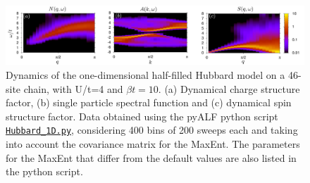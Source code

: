 \begin{figure}
\center
\includegraphics[width=\textwidth,clip]{Spectral_1D.pdf}

\caption{Dynamics of the one-dimensional half-filled Hubbard model  on a 46-site chain, with U/t=4 and $\beta t = 10$.  (a) Dynamical charge structure factor, (b) single particle spectral function and (c) dynamical spin structure factor.  Data obtained using the pyALF python script 
 \href{https://git.physik.uni-wuerzburg.de/ALF/ALF/-/blob/ALF-2.0/Documentation/Figures/MaxEnt/Hubbard_1D.py}{\texttt{Hubbard\_1D.py}}, considering 400 bins of 200 sweeps each and taking into account the covariance matrix for the MaxEnt.  The parameters for the MaxEnt  that differ from the default values are also listed in the python script.}
        \label{Fig:Spectral1D}
\end{figure}
